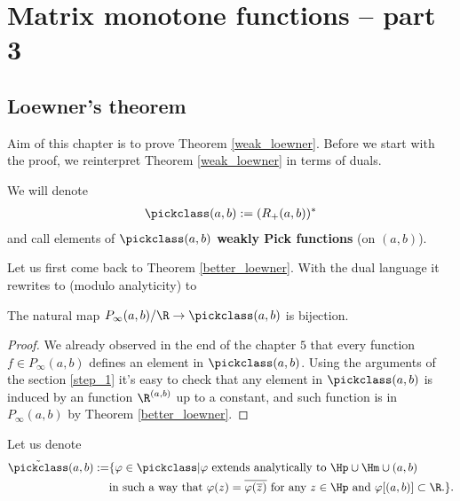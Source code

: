 \chapter{Matrix monotone functions -- part 3}

\section{Loewner's theorem}

Aim of this chapter is to prove Theorem \ref{weak_loewner}. Before we start with the proof, we reinterpret Theorem \ref{weak_loewner} in terms of duals.

\begin{maar}
	We will denote
	\begin{align*}
		\pickclass(a, b) := (R_{+}(a, b))^{*}
	\end{align*}
	and call elements of $\pickclass(a, b)$ \textbf{weakly Pick functions} (on $(a, b)$).
\end{maar}

Let us first come back to Theorem \ref{better_loewner}. With the dual language it rewrites to (modulo analyticity) to
\begin{lause}\label{bester_loewner}
	The natural map $P_{\infty}(a, b)/\R \to \pickclass(a, b)$ is bijection.
\end{lause}
\begin{proof}
	We already observed in the end of the chapter $5$ that every function $f \in P_{\infty}(a, b)$ defines an element in $\pickclass(a, b)$. Using the arguments of the section \ref{step_1} it's easy to check that any element in $\pickclass(a, b)$ is induced by an function $\R^{(a, b)}$ up to a constant, and such function is in $P_{\infty}(a, b)$ by Theorem \ref{better_loewner}.
\end{proof}

Let us denote
\begin{align*}
	\tilde{\pickclass}(a, b) :=& \{\varphi \in \pickclass | \text{$\varphi$ extends analytically to $\Hp \cup \Hm \cup (a, b)$} \\
	&\text{in such a way that $\varphi(z) = \overline{\varphi(\overline{z})}$ for any $z \in \Hp$ and $\varphi[(a, b)] \subset \R.$}\}.
\end{align*}

